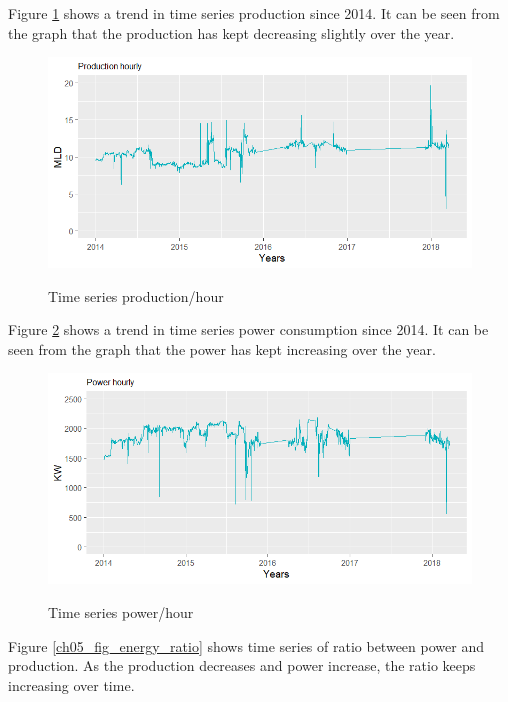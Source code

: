 Figure \ref{ch05_fig_energy_production} shows a trend in time series production since 2014. It can be seen from the graph that the production has kept decreasing slightly over the year. 

\begin{figure}[!htb]
	\includegraphics[scale=0.6]{figures/ch05_fig_energy_production} \\
	\caption{Time series production/hour}
	\label{ch05_fig_energy_production} 
\end{figure}

Figure \ref{ch05_fig_energy_power} shows a trend in time series power consumption since 2014. It can be seen from the graph that the power has kept increasing over the year. 

\begin{figure}[!htb]
	\includegraphics[scale=0.6]{figures/ch05_fig_energy_power} \\
	\caption{Time series power/hour}
	\label{ch05_fig_energy_power} 
\end{figure}
Figure \ref{ch05_fig_energy_ratio} shows time series of ratio between power and production. As the production decreases and power increase, the ratio keeps increasing over time. 


